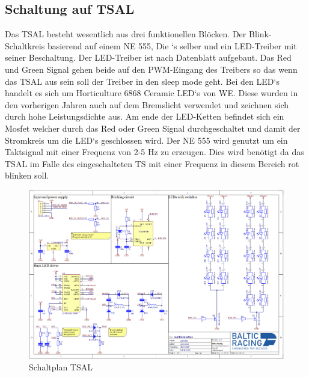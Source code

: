 \FloatBarrier
\subsection{Schaltung auf \ac{TSAL}}

Das \ac{TSAL} besteht wesentlich aus drei funktionellen Blöcken. Der Blink-Schaltkreis basierend auf einem NE 555, Die `s selber und ein \ac{LED}-Treiber mit seiner Beschaltung. Der \ac{LED}-Treiber ist nach Datenblatt aufgebaut. Das Red und Green Signal gehen beide auf den \ac{PWM}-Eingang des Treibers so das wenn das \ac{TSAL} aus sein soll der Treiber in den sleep mode geht. Bei den \ac{LED}`s handelt es sich um Horticulture 6868 Ceramic \ac{LED}`s von \ac{WE}. Diese wurden in den vorherigen Jahren auch auf dem Bremslicht verwendet und zeichnen sich durch hohe Leistungsdichte aus. Am ende der \ac{LED}-Ketten befindet sich ein Mosfet welcher durch das Red oder Green Signal durchgeschaltet und damit der Stromkreis um die \ac{LED}`s geschlossen wird. Der NE 555 wird genutzt um ein Taktsignal mit einer Frequenz von 2-5 Hz zu erzeugen. Dies wird benötigt da das \ac{TSAL} im Falle des eingeschalteten \ac{TS} mit einer Frequenz in diesem Bereich rot blinken soll.

\begin{figure}
	\centering
	\includegraphics[width=0.7\linewidth]{"bilder/Tsal Schematic"}
	\caption{Schaltplan \ac{TSAL}}
	\label{fig:tsal-schematic}
\end{figure}

\FloatBarrier